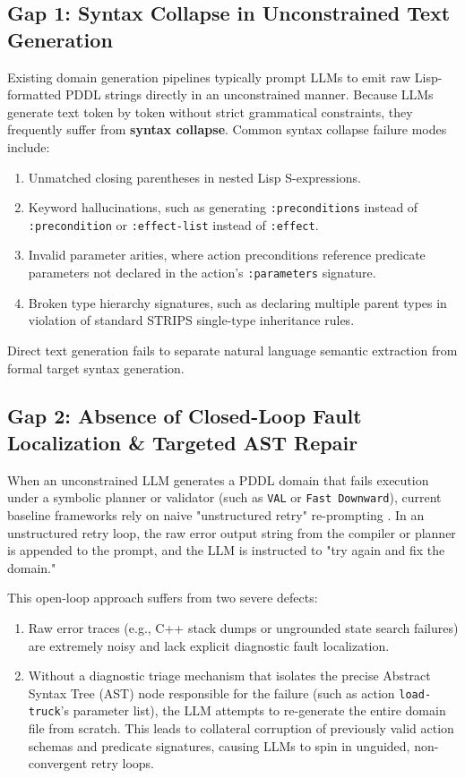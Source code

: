 \documentclass[11pt,a4paper]{report}
\begin{document}
\subsection{Gap 1: Syntax Collapse in Unconstrained Text Generation}
Existing domain generation pipelines typically prompt LLMs to emit raw Lisp-formatted PDDL strings directly in an unconstrained manner. Because LLMs generate text token by token without strict grammatical constraints, they frequently suffer from \textbf{syntax collapse}. Common syntax collapse failure modes include:
\begin{enumerate}[label=(\alph*)]
    \item Unmatched closing parentheses in nested Lisp S-expressions.
    \item Keyword hallucinations, such as generating \texttt{:preconditions} instead of \texttt{:precondition} or \texttt{:effect-list} instead of \texttt{:effect}.
    \item Invalid parameter arities, where action preconditions reference predicate parameters not declared in the action's \texttt{:parameters} signature.
    \item Broken type hierarchy signatures, such as declaring multiple parent types in violation of standard STRIPS single-type inheritance rules.
\end{enumerate}
Direct text generation fails to separate natural language semantic extraction from formal target syntax generation.

\subsection{Gap 2: Absence of Closed-Loop Fault Localization \& Targeted AST Repair}
When an unconstrained LLM generates a PDDL domain that fails execution under a symbolic planner or validator (such as \texttt{VAL} or \texttt{Fast Downward}), current baseline frameworks rely on naive "unstructured retry" re-prompting \cite{more2024}. In an unstructured retry loop, the raw error output string from the compiler or planner is appended to the prompt, and the LLM is instructed to "try again and fix the domain." 

This open-loop approach suffers from two severe defects:
\begin{enumerate}[label=(\alph*)]
    \item Raw error traces (e.g., C++ stack dumps or ungrounded state search failures) are extremely noisy and lack explicit diagnostic fault localization.
    \item Without a diagnostic triage mechanism that isolates the precise Abstract Syntax Tree (AST) node responsible for the failure (such as action \texttt{load-truck}'s parameter list), the LLM attempts to re-generate the entire domain file from scratch. This leads to collateral corruption of previously valid action schemas and predicate signatures, causing LLMs to spin in unguided, non-convergent retry loops.
\end{enumerate}
\end{document}
